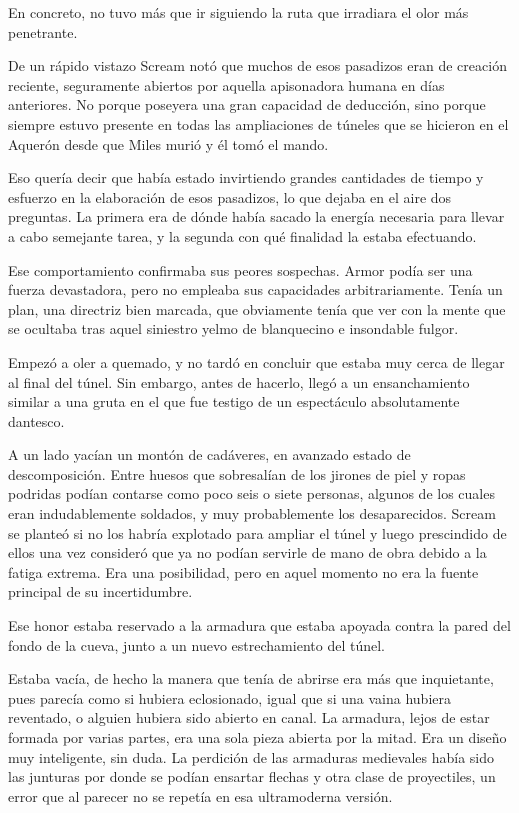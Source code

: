 En concreto, no tuvo más que ir siguiendo la ruta que irradiara el olor más penetrante.

De un rápido vistazo Scream notó que muchos de esos pasadizos eran de creación reciente, seguramente abiertos por aquella apisonadora humana en días anteriores. No porque poseyera una gran capacidad de deducción, sino porque siempre estuvo presente en todas las ampliaciones de túneles que se hicieron en el Aquerón desde que Miles murió y él tomó el mando.

Eso quería decir que había estado invirtiendo grandes cantidades de tiempo y esfuerzo en la elaboración de esos pasadizos, lo que dejaba en el aire dos preguntas. La primera era de dónde había sacado la energía necesaria para llevar a cabo semejante tarea, y la segunda con qué finalidad la estaba efectuando.

Ese comportamiento confirmaba sus peores sospechas. Armor podía ser una fuerza devastadora, pero no empleaba sus capacidades arbitrariamente. Tenía un plan, una directriz bien marcada, que obviamente tenía que ver con la mente que se ocultaba tras aquel siniestro yelmo de blanquecino e insondable fulgor.

Empezó a oler a quemado, y no tardó en concluir que estaba muy cerca de llegar al final del túnel. Sin embargo, antes de hacerlo, llegó a un ensanchamiento similar a una gruta en el que fue testigo de un espectáculo absolutamente dantesco.

A un lado yacían un montón de cadáveres, en avanzado estado de descomposición. Entre huesos que sobresalían de los jirones de piel y ropas podridas podían contarse como poco seis o siete personas, algunos de los cuales eran indudablemente soldados, y muy probablemente los desaparecidos. Scream se planteó si no los habría explotado para ampliar el túnel y luego prescindido de ellos una vez consideró que ya no podían servirle de mano de obra debido a la fatiga extrema. Era una posibilidad, pero en aquel momento no era la fuente principal de su incertidumbre.

Ese honor estaba reservado a la armadura que estaba apoyada contra la pared del fondo de la cueva, junto a un nuevo estrechamiento del túnel.

Estaba vacía, de hecho la manera que tenía de abrirse era más que inquietante, pues parecía como si hubiera eclosionado, igual que si una vaina hubiera reventado, o alguien hubiera sido abierto en canal. La armadura, lejos de estar formada por varias partes, era una sola pieza abierta por la mitad. Era un diseño muy inteligente, sin duda. La perdición de las armaduras medievales había sido las junturas por donde se podían ensartar flechas y otra clase de proyectiles, un error que al parecer no se repetía en esa ultramoderna versión.

